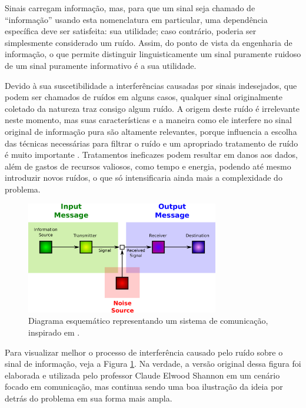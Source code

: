 Sinais carregam informação, mas, para que um sinal seja chamado de ``informação'' usando esta nomenclatura em particular, uma dependência específica deve ser satisfeita: sua utilidade; caso contrário, poderia ser simplesmente considerado um ruído. Assim, do ponto de vista da engenharia de informação, o que permite distinguir linguisticamente um sinal puramente ruidoso de um sinal puramente informativo é a sua utilidade.

Devido à sua suscetibilidade a interferências causadas por sinais indesejados, que podem ser chamados de ruídos em alguns casos, qualquer sinal originalmente coletado da natureza traz consigo algum ruído. A origem deste ruído é irrelevante neste momento, mas suas características e a maneira como ele interfere no sinal original de informação pura são altamente relevantes, porque influencia a escolha das técnicas necessárias para filtrar o ruído \citep{tuzlukov2002signal} e um apropriado tratamento de ruído é muito importante \citep{boll1979suppression, 382009, 1451965, 4766994}. Tratamentos ineficazes podem resultar em danos aos dados, além de gastos de recursos valiosos, como tempo e energia, podendo até mesmo introduzir novos ruídos, o que só intensificaria ainda mais a complexidade do problema.


\begin{figure}[H]
    \centering
    \includegraphics[width=0.75\textwidth]{figs/communication_diagram.pdf}
    \caption{Diagrama esquemático representando um sistema de comunicação, inspirado em \citep{shannon1948mathematical}.}
    \label{fig:communication_diagram}
\end{figure}

Para visualizar melhor o processo de interferência causado pelo ruído sobre o sinal de informação, veja a Figura \ref{fig:communication_diagram}. Na verdade, a versão original dessa figura foi elaborada e utilizada pelo professor Claude Elwood Shannon em um cenário focado em comunicação, mas continua sendo uma boa ilustração da ideia por detrás do problema em sua forma mais ampla.

